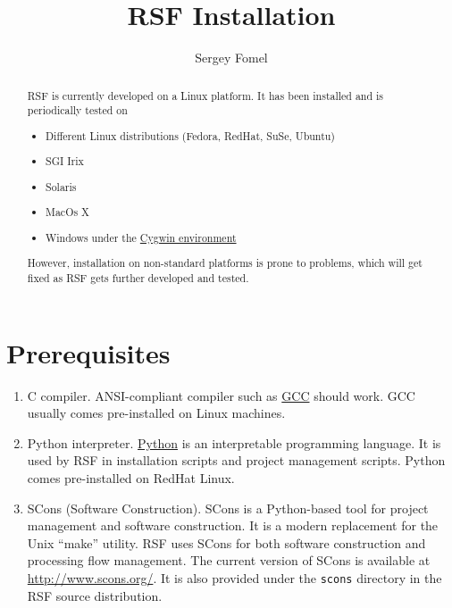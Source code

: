 \title{RSF Installation}
\author{Sergey Fomel}

%

\maketitle

\begin{abstract}
RSF is currently developed on a Linux platform. It has been installed and is
periodically tested on
\begin{itemize}
\item Different Linux distributions (Fedora, RedHat, SuSe, Ubuntu)
\item SGI Irix
\item Solaris
\item MacOs X
\item Windows under the \href{http://www.cygwin.com/}{Cygwin environment} 
\end{itemize}
However, installation on non-standard platforms is prone to problems, which
will get fixed as RSF gets further developed and tested.
\end{abstract}

\section{Prerequisites}

\begin{enumerate}
\item C compiler. ANSI-compliant compiler such as
  \href{http://gcc.gnu.org/}{GCC} should work. GCC usually comes pre-installed
  on Linux machines.
\item Python interpreter. \href{http://www.python.org/}{Python} is an
  interpretable programming language. It is used by RSF in installation
  scripts and project management scripts.  Python comes pre-installed on
  RedHat Linux.
\item SCons (Software Construction). SCons is a Python-based tool for project
  management and software construction. It is a modern replacement for the
  Unix ``make'' utility. RSF uses SCons for both software construction and
  processing flow management. The current version of SCons is available at
  \url{http://www.scons.org/}. It is also provided under the \texttt{scons}
  directory in the RSF source distribution.
\end{enumerate}

